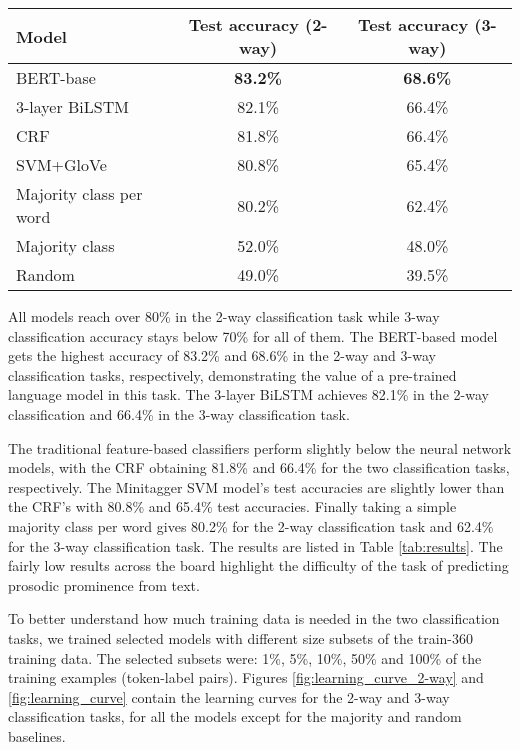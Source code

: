 \documentclass[11pt]{article}
\begin{document}
\begin{table*}[ht!]
    \centering
    \begin{tabular}{l c c}
    \hline
    \bf Model & \bf Test accuracy (2-way) & \bf Test accuracy (3-way) \\
    \hline
        BERT-base & \bf83.2\% & \bf68.6\%\\
        3-layer BiLSTM & 82.1\% & 66.4\% \\
        CRF & 81.8\% & 66.4\%\\
        SVM+GloVe & 80.8\% & 65.4\% \\
        Majority class per word & 80.2\% & 62.4\% \\
        Majority class & 52.0\% & 48.0\% \\ 
        Random & 49.0\% & 39.5\% \\
    \hline
    \end{tabular}
    \caption{Experimental results (\%) for the 2 and 3-way classification tasks.}
    \label{tab:results}
\end{table*}

All models reach over 80\% in the 2-way classification task while 3-way classification accuracy stays below 70\% for all of them. The BERT-based model gets the highest accuracy of 83.2\% and 68.6\% in the 2-way and 3-way classification tasks, respectively, demonstrating the value of a pre-trained language model in this task. The 3-layer BiLSTM achieves 82.1\% in the 2-way classification and 66.4\% in the 3-way classification task.

The traditional feature-based classifiers perform slightly below the neural network models, with the CRF obtaining 81.8\% and 66.4\% for the two classification tasks, respectively. The Minitagger SVM model's test accuracies are slightly lower than the CRF's with 80.8\% and 65.4\% test accuracies. Finally taking a simple majority class per word gives 80.2\% for the 2-way classification task and 62.4\% for the 3-way classification task. The results are listed in Table \ref{tab:results}. The fairly low results across the board highlight the difficulty of the task of predicting prosodic prominence from text. 

To better understand how much training data is needed in the two classification tasks, we trained selected models with different size subsets of the train-360 training data. The selected subsets were: 1\%, 5\%, 10\%, 50\% and 100\% of the training examples (token-label pairs). Figures \ref{fig:learning_curve_2-way} and \ref{fig:learning_curve} contain the learning curves for the 2-way and 3-way classification tasks, for all the models except for the majority and random baselines.
\end{document}
